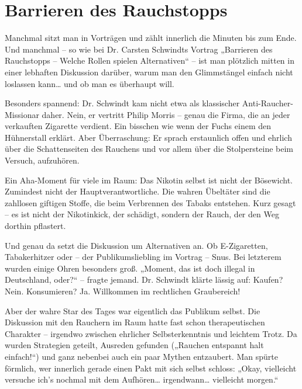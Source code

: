 \section{Barrieren des Rauchstopps}


\begin{multicols}{2}
Manchmal sitzt man in Vorträgen und zählt
innerlich die Minuten bis zum Ende. Und manchmal – so wie bei Dr. Carsten
Schwindts Vortrag „Barrieren des Rauchstopps – Welche Rollen spielen
Alternativen“ – ist man plötzlich mitten in einer lebhaften Diskussion darüber,
warum man den Glimmstängel einfach nicht loslassen kann… und ob man es
überhaupt will.

Besonders spannend: Dr. Schwindt kam nicht
etwa als klassischer Anti-Raucher-Missionar daher. Nein, er vertritt Philip
Morris – genau die Firma, die an jeder verkauften Zigarette verdient. Ein
bisschen wie wenn der Fuchs einem den Hühnerstall erklärt. Aber Überraschung:
Er sprach erstaunlich offen und ehrlich über die Schattenseiten des Rauchens
und vor allem über die Stolpersteine beim Versuch, aufzuhören.

Ein Aha-Moment für viele im Raum: Das
Nikotin selbst ist nicht der Bösewicht. Zumindest nicht der
Hauptverantwortliche. Die wahren Übeltäter sind die zahllosen giftigen Stoffe,
die beim Verbrennen des Tabaks entstehen. Kurz gesagt – es ist nicht der Nikotinkick,
der schädigt, sondern der Rauch, der den Weg dorthin pflastert.

Und genau da setzt die Diskussion um
Alternativen an. Ob E-Zigaretten, Tabakerhitzer oder – der Publikumsliebling im
Vortrag – Snus. Bei letzterem wurden einige Ohren besonders groß. „Moment, das
ist doch illegal in Deutschland, oder?“ – fragte jemand. Dr. Schwindt klärte
lässig auf: Kaufen? Nein. Konsumieren? Ja. Willkommen im rechtlichen
Graubereich!

Aber der wahre Star des Tages war
eigentlich das Publikum selbst. Die Diskussion mit den Rauchern im Raum hatte
fast schon therapeutischen Charakter – irgendwo zwischen ehrlicher
Selbsterkenntnis und leichtem Trotz. Da wurden Strategien geteilt, Ausreden
gefunden („Rauchen entspannt halt einfach!“) und ganz nebenbei auch ein paar
Mythen entzaubert. Man spürte förmlich, wer innerlich gerade einen Pakt mit
sich selbst schloss: „Okay, vielleicht versuche ich’s nochmal mit dem Aufhören…
irgendwann… vielleicht morgen.“


\end{multicols}
